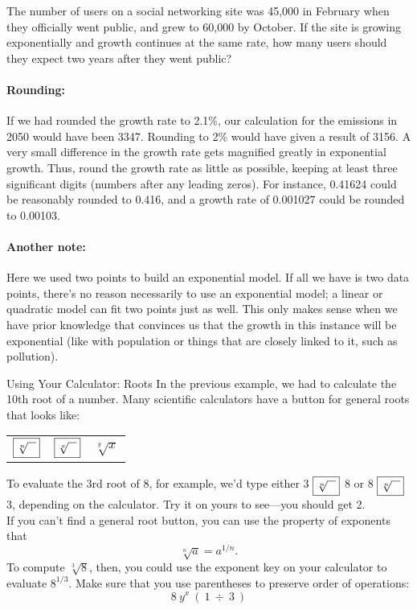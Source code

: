 \begin{try}
The number of users on a social networking site was 45,000 in February when they officially went public, and grew to 60,000 by October.  If the site is growing exponentially and growth continues at the same rate, how many users should they expect two years after they went public?
\end{try}

\paragraph{Rounding:} If we had rounded the growth rate to 2.1\%, our calculation for the emissions in 2050 would have been 3347.  Rounding to 2\% would have given a result of 3156.  A very small difference in the growth rate gets magnified greatly in exponential growth.  Thus, round the growth rate as little as possible, keeping at least three significant digits (numbers after any leading zeros).  For instance, 0.41624 could be reasonably rounded to 0.416, and a growth rate of 0.001027 could be rounded to 0.00103.

\paragraph{Another note:} Here we used two points to build an exponential model.  If all we have is two data points, there's no reason necessarily to use an exponential model; a linear or quadratic model can fit two points just as well.  This only makes sense when we have prior knowledge that convinces us that the growth in this instance will be exponential (like with population or things that are closely linked to it, such as pollution).

\begin{proc}{Using Your Calculator: Roots}
In the previous example, we had to calculate the 10th root of a number.  Many scientific calculators have a button for general roots that looks like:
\begin{center}
\begin{tabular}{c c c}
$\boxed{\sqrt[n]{\hspace{0.1in}}}$ & $\boxed{\sqrt[x]{\hspace{0.1in}}}$ & $\boxed{\sqrt[y]{x}}$
\end{tabular}
\end{center}

To evaluate the 3rd root of 8, for example, we'd type either 3 $\boxed{\sqrt[n]{\hspace{0.1in}}}$ 8 or 8 $\boxed{\sqrt[n]{\hspace{0.1in}}}$ 3, depending on the calculator.  Try it on yours to see---you should get 2.\\

If you can't find a general root button, you can use the property of exponents that \[\sqrt[n]{a} = a^{1/n}.\]
To compute $\sqrt[3]{8}$, then, you could use the exponent key on your calculator to evaluate $8^{1/3}$.  Make sure that you use parentheses to preserve order of operations:
\[8\ \boxed{y^x}\ (\ 1\ \boxed{\div}\ 3\ )\]
\end{proc}

